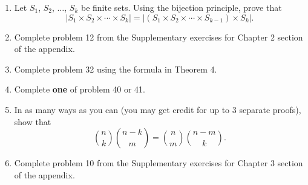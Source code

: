 \documentclass[12pt]{article}
\begin{document}
\begin{enumerate}
 \item Let $S_1$, $S_2$, $\ldots$, $S_k$ be finite sets. Using the bijection principle, prove that $$|S_1\times S_2\times\cdots \times S_k|=|(S_1\times S_2\times\cdots\times S_{k-1})\times S_{k}|.$$
\item Complete problem 12 from the Supplementary exercises for Chapter 2 section of the appendix. 

\item Complete problem 32 using the formula in Theorem 4. 
\item Complete {\bf one} of problem 40 or 41. 
\item In as many ways as you can (you may get credit for up to 3 separate proofs), show that $${n\choose k}{n-k\choose m}={n\choose m}{n-m\choose k}.$$
\item Complete problem 10 from the Supplementary exercises for Chapter 3 section of the appendix. 
\end{enumerate}
\end{document}
